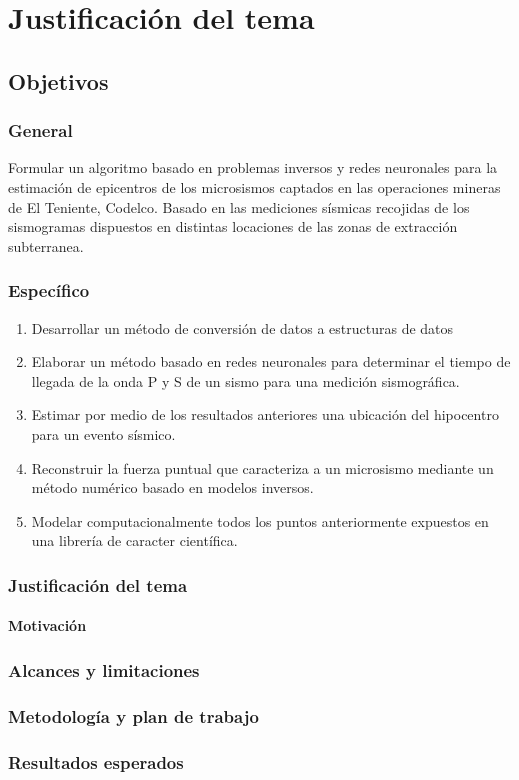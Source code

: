 \chapter{Justificación del tema} 

\section{Objetivos}

\subsection{General}

Formular un algoritmo basado en problemas inversos y redes neuronales para la
estimación de epicentros de los microsismos captados en las operaciones mineras
de El Teniente, Codelco. Basado en las mediciones sísmicas recojidas de los
sismogramas dispuestos en distintas locaciones de las zonas de extracción
subterranea.


\subsection{Específico}

\begin{enumerate}
  \item Desarrollar un método de conversión de datos a estructuras de datos
  \item Elaborar un método basado en redes neuronales para determinar el
  tiempo de llegada de la onda P y S de un sismo para una medición sismográfica.
  \item Estimar por medio de los resultados anteriores una ubicación del
  hipocentro para un evento sísmico.
  \item Reconstruir la fuerza puntual que caracteriza a un microsismo mediante
  un método numérico basado en modelos inversos.
  \item Modelar computacionalmente todos los puntos anteriormente expuestos en
  una librería de caracter científica.
\end{enumerate}


\subsection{Justificación del tema}
\subsubsection{Motivación}

\subsection{Alcances y limitaciones}

\subsection{Metodología y plan de trabajo}

\subsection{Resultados esperados}

